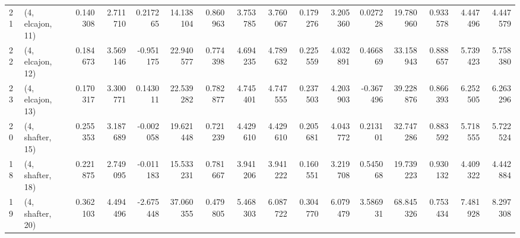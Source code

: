 \begin{tabular}{llrrrrrrrrrrrrrr}
21 &  (4, elcajon, 11) &   0.140308 &  2.711710 &  0.217265 &  14.138104 &  0.860963 &   3.753785 &  3.760067 &  0.179276 &  3.205360 &  0.027228 &   19.780960 &  0.933578 &   4.447496 &   4.447579 \\
22 &  (4, elcajon, 12) &   0.184673 &  3.569146 & -0.951175 &  22.940577 &  0.774398 &   4.694235 &  4.789632 &  0.225559 &  4.032891 &  0.466869 &   33.158943 &  0.888657 &   5.739423 &   5.758380 \\
23 &  (4, elcajon, 13) &   0.170317 &  3.300771 &  0.143011 &  22.539282 &  0.782877 &   4.745401 &  4.747555 &  0.237503 &  4.203903 & -0.367496 &   39.228876 &  0.866393 &   6.252505 &   6.263296 \\
20 &  (4, shafter, 15) &   0.255353 &  3.187689 & -0.002058 &  19.621448 &  0.721239 &   4.429610 &  4.429610 &  0.205681 &  4.043772 &  0.213101 &   32.747286 &  0.883592 &   5.718555 &   5.722524 \\
18 &  (4, shafter, 18) &   0.221875 &  2.749095 & -0.011183 &  15.533231 &  0.781667 &   3.941206 &  3.941222 &  0.160551 &  3.219708 &  0.545068 &   19.739223 &  0.930132 &   4.409322 &   4.442884 \\
19 &  (4, shafter, 20) &   0.362103 &  4.494496 & -2.675448 &  37.060355 &  0.479805 &   5.468303 &  6.087722 &  0.304770 &  6.079479 &  3.586931 &   68.845326 &  0.753434 &   7.481928 &   8.297308 \\
\bottomrule
\end{tabular}
